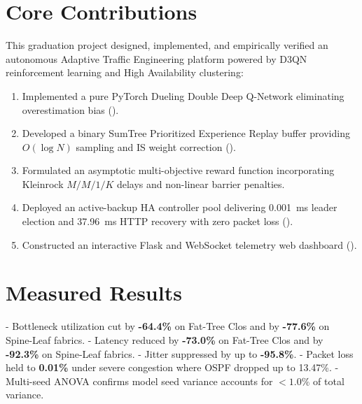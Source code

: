\documentclass[12pt,a4paper,oneside]{report}
\begin{document}
\section{Core Contributions}
This graduation project designed, implemented, and empirically verified an autonomous Adaptive Traffic Engineering platform powered by D3QN reinforcement learning and High Availability clustering:
\begin{enumerate}
    \item Implemented a pure PyTorch Dueling Double Deep Q-Network eliminating overestimation bias ().
    \item Developed a binary SumTree Prioritized Experience Replay buffer providing $O(\log N)$ sampling and IS weight correction ().
    \item Formulated an asymptotic multi-objective reward function incorporating Kleinrock $M/M/1/K$ delays and non-linear barrier penalties.
    \item Deployed an active-backup HA controller pool delivering 0.001~ms leader election and 37.96~ms HTTP recovery with zero packet loss ().
    \item Constructed an interactive Flask and WebSocket telemetry web dashboard ().
\end{enumerate}

\section{Measured Results}
- Bottleneck utilization cut by \textbf{-64.4\%} on Fat-Tree Clos and by \textbf{-77.6\%} on Spine-Leaf fabrics.
- Latency reduced by \textbf{-73.0\%} on Fat-Tree Clos and by \textbf{-92.3\%} on Spine-Leaf fabrics.
- Jitter suppressed by up to \textbf{-95.8\%}.
- Packet loss held to \textbf{0.01\%} under severe congestion where OSPF dropped up to 13.47\%.
- Multi-seed ANOVA confirms model seed variance accounts for \textbf{$<1.0\%$} of total variance.
\end{document}
